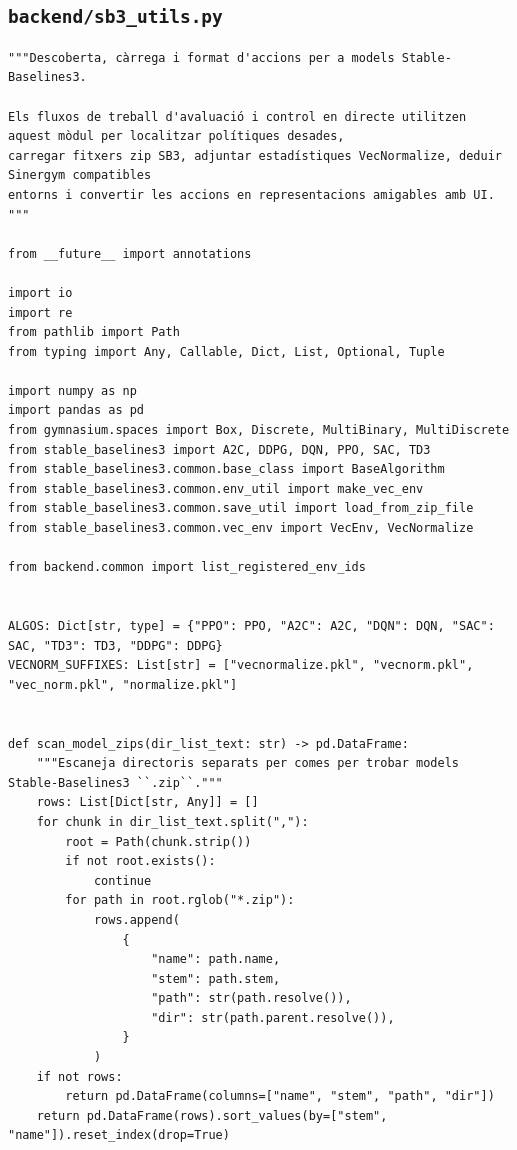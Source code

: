 \documentclass[10pt,a4paper]{article}
\begin{document}

\subsection{\texorpdfstring{\texttt{backend/sb3\_utils.py}}{backend/sb3\_utils.py}}

\begin{lstlisting}[style=studioPython,caption={backend/sb3\_utils.py},label={lst:backend-sb3-utils-py}]
"""Descoberta, càrrega i format d'accions per a models Stable-Baselines3.

Els fluxos de treball d'avaluació i control en directe utilitzen aquest mòdul per localitzar polítiques desades,
carregar fitxers zip SB3, adjuntar estadístiques VecNormalize, deduir Sinergym compatibles
entorns i convertir les accions en representacions amigables amb UI.
"""

from __future__ import annotations

import io
import re
from pathlib import Path
from typing import Any, Callable, Dict, List, Optional, Tuple

import numpy as np
import pandas as pd
from gymnasium.spaces import Box, Discrete, MultiBinary, MultiDiscrete
from stable_baselines3 import A2C, DDPG, DQN, PPO, SAC, TD3
from stable_baselines3.common.base_class import BaseAlgorithm
from stable_baselines3.common.env_util import make_vec_env
from stable_baselines3.common.save_util import load_from_zip_file
from stable_baselines3.common.vec_env import VecEnv, VecNormalize

from backend.common import list_registered_env_ids


ALGOS: Dict[str, type] = {"PPO": PPO, "A2C": A2C, "DQN": DQN, "SAC": SAC, "TD3": TD3, "DDPG": DDPG}
VECNORM_SUFFIXES: List[str] = ["vecnormalize.pkl", "vecnorm.pkl", "vec_norm.pkl", "normalize.pkl"]


def scan_model_zips(dir_list_text: str) -> pd.DataFrame:
    """Escaneja directoris separats per comes per trobar models Stable-Baselines3 ``.zip``."""
    rows: List[Dict[str, Any]] = []
    for chunk in dir_list_text.split(","):
        root = Path(chunk.strip())
        if not root.exists():
            continue
        for path in root.rglob("*.zip"):
            rows.append(
                {
                    "name": path.name,
                    "stem": path.stem,
                    "path": str(path.resolve()),
                    "dir": str(path.parent.resolve()),
                }
            )
    if not rows:
        return pd.DataFrame(columns=["name", "stem", "path", "dir"])
    return pd.DataFrame(rows).sort_values(by=["stem", "name"]).reset_index(drop=True)



\end{lstlisting}
\end{document}
